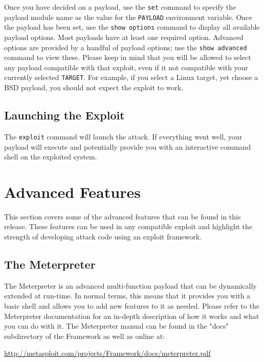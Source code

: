 \documentclass{report}
\begin{document}
\par
Once you have decided on a payload, use the \texttt{set} command to specify the payload
module name as the value for the \texttt{PAYLOAD} environment variable. Once the payload
has been set, use the \texttt{show options} command to display all available payload
options. Most payloads have at least one required option. Advanced options are
provided by a handful of payload options; use the \texttt{show advanced} command to view
these. Please keep in mind that you will be allowed to select any payload
compatible with that exploit, even if it not compatible with your currently
selected \texttt{TARGET}. For example, if you select a Linux target, yet choose
a BSD payload, you should not expect the exploit to work.


	\section{Launching the Exploit}
\par
The \texttt{exploit} command will launch the attack. If everything went well, your
payload will execute and potentially provide you with an interactive command
shell on the exploited system. 


\pagebreak
\chapter{Advanced Features}

\par
This section covers some of the advanced features that can be found in this
release. These features can be used in any compatible exploit and highlight the
strength of developing attack code using an exploit framework. 

\section{The Meterpreter}
\par
The Meterpreter is an advanced multi-function payload that can be dynamically
extended at run-time. In normal terms, this means that it provides you with a
basic shell and allows you to add new features to it as needed. Please refer to
the Meterpreter documentation for an in-depth description of how it works and
what you can do with it. The Meterpreter manual can be found in the "docs"
subdirectory of the Framework as well as online at:

\url{http://metasploit.com/projects/Framework/docs/meterpreter.pdf}
\end{document}
